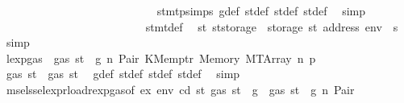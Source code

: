 \begin{isabellebody}
\ \ \ \ \ \ \ \ \ \ \ \ \ \ \ \ \ \ \ \ \ \ \ \ \ \ \isamarkupfalse%
\ stmt{\isachardot}{\kern0pt}psimps{\isacharparenleft}{\kern0pt}{}{\isacharparenright}{\kern0pt}\ g{\isacharunderscore}{\kern0pt}def\ st{\isacharprime}{\kern0pt}{\isacharunderscore}{\kern0pt}def\ st{\isacharprime}{\kern0pt}{\isacharprime}{\kern0pt}{\isacharunderscore}{\kern0pt}def\ st{\isacharprime}{\kern0pt}{\isacharprime}{\kern0pt}{\isacharprime}{\kern0pt}{\isacharunderscore}{\kern0pt}def\ \isamarkupfalse%
\ simp\isanewline
\ \ \ \ \ \ \ \ \ \ \ \ \ \ \ \ \ \ \ \ \ \ \ \ \isamarkupfalse%
\ stmt{\isacharunderscore}{\kern0pt}def\ \isamarkupfalse%
\ {\isachardoublequoteopen}st{}{\isacharprime}{\kern0pt}{\isacharequal}{\kern0pt}\ st{\isacharprime}{\kern0pt}{\isacharprime}{\kern0pt}{\isacharprime}{\kern0pt}{\isasymlparr}storage\ {\isacharcolon}{\kern0pt}{\isacharequal}{\kern0pt}\ {\isacharparenleft}{\kern0pt}storage\ st{\isacharprime}{\kern0pt}{\isacharprime}{\kern0pt}{\isacharprime}{\kern0pt}{\isacharparenright}{\kern0pt}\ {\isacharparenleft}{\kern0pt}address\ env\ {\isacharcolon}{\kern0pt}{\isacharequal}{\kern0pt}\ s{\isacharparenright}{\kern0pt}{\isasymrparr}{\isachardoublequoteclose}\ \isamarkupfalse%
\ simp\isanewline
\ \ \ \ \ \ \ \ \ \ \ \ \ \ \ \ \ \ \ \ \ \ \ \ \isamarkupfalse%
\ \isamarkupfalse%
\ lexp{\isacharunderscore}{\kern0pt}gas\ {\isacharbackquoteopen}{\isasymnot}\ gas\ st\ {\isasymle}\ g{\isacharbackquoteclose}\ n\ Pair\ KMemptr\ Memory\ MTArray\ n{}\ p{}\ \isamarkupfalse%
\ {\isachardoublequoteopen}gas\ st{\isacharprime}{\kern0pt}{\isacharprime}{\kern0pt}{\isacharprime}{\kern0pt}\ {\isasymle}\ gas\ st{\isacharprime}{\kern0pt}{\isacharprime}{\kern0pt}{\isachardoublequoteclose}\ \isamarkupfalse%
\ g{\isacharunderscore}{\kern0pt}def\ st{\isacharprime}{\kern0pt}{\isacharunderscore}{\kern0pt}def\ st{\isacharprime}{\kern0pt}{\isacharprime}{\kern0pt}{\isacharunderscore}{\kern0pt}def\ st{\isacharprime}{\kern0pt}{\isacharprime}{\kern0pt}{\isacharprime}{\kern0pt}{\isacharunderscore}{\kern0pt}def\ \isamarkupfalse%
\ simp\isanewline
\ \ \ \ \ \ \ \ \ \ \ \ \ \ \ \ \ \ \ \ \ \ \ \ \isamarkupfalse%
\ \isamarkupfalse%
\ msel{\isacharunderscore}{\kern0pt}ssel{\isacharunderscore}{\kern0pt}expr{\isacharunderscore}{\kern0pt}load{\isacharunderscore}{\kern0pt}rexp{\isacharunderscore}{\kern0pt}gas{\isacharparenleft}{\kern0pt}{}{\isacharparenright}{\kern0pt}{\isacharbrackleft}{\kern0pt}of\ ex\ env\ cd\ st{\isacharprime}{\kern0pt}\ {\isachardoublequoteopen}gas\ st\ {\isacharminus}{\kern0pt}\ g{\isachardoublequoteclose}{\isacharbrackright}{\kern0pt}\ {\isacharbackquoteopen}{\isasymnot}\ gas\ st\ {\isasymle}\ g{\isacharbackquoteclose}\ n\ Pair\ \isamarkupfalse%

\end{isabellebody}
